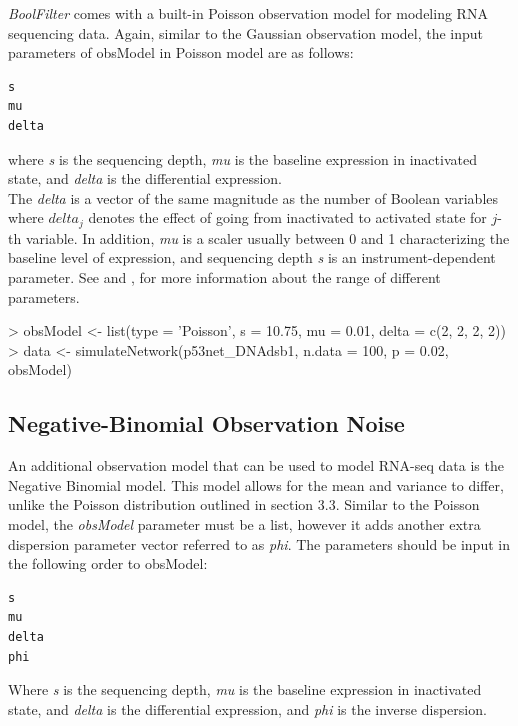\documentclass[a4paper]{article}
\theoremstyle{plain}
\theoremstyle{definition}
\theoremstyle{remark}
\begin{document}
\textit{BoolFilter} comes with a built-in Poisson observation model for modeling RNA sequencing data. Again, similar to the Gaussian observation model, the input parameters of obsModel in Poisson model are as follows:

\begin{verbatim}
s
mu
delta
\end{verbatim}

where \textit{s} is the sequencing depth, \textit{mu} is the baseline expression in inactivated state, and \textit{delta} is the differential expression.
\\[1em]
The \textit{delta} is a vector of the same magnitude as the number of Boolean variables where $delta_j$ denotes the effect of going from inactivated to activated state for $j$-th variable. In addition, \textit{mu} is a scaler usually between 0 and 1 characterizing the baseline level of expression, and sequencing depth \textit{s} is an instrument-dependent parameter. See \cite{ImanBrag:15b} and \cite{BahaBrag:15}, for more information about the range of different parameters.


\begin{Schunk}
\begin{Sinput}
> obsModel <- list(type = 'Poisson', s = 10.75, mu = 0.01, delta = c(2, 2, 2, 2))
> data <- simulateNetwork(p53net_DNAdsb1, n.data = 100, p = 0.02, obsModel)
\end{Sinput}
\end{Schunk}



\subsection{Negative-Binomial Observation Noise}

An additional observation model that can be used to model RNA-seq data is the Negative Binomial model. This model allows for the mean and variance to differ, unlike the Poisson distribution outlined in section 3.3. Similar to the Poisson model, the \textit{obsModel} parameter must be a list, however it adds another extra dispersion parameter vector referred to as \textit{phi}. The parameters should be input in the following order to obsModel:

\begin{verbatim}
s
mu
delta
phi
\end{verbatim}

Where \textit{s} is the sequencing depth, \textit{mu} is the baseline expression in inactivated state, and \textit{delta} is the differential expression, and \textit{phi} is the inverse dispersion.
\end{document}
